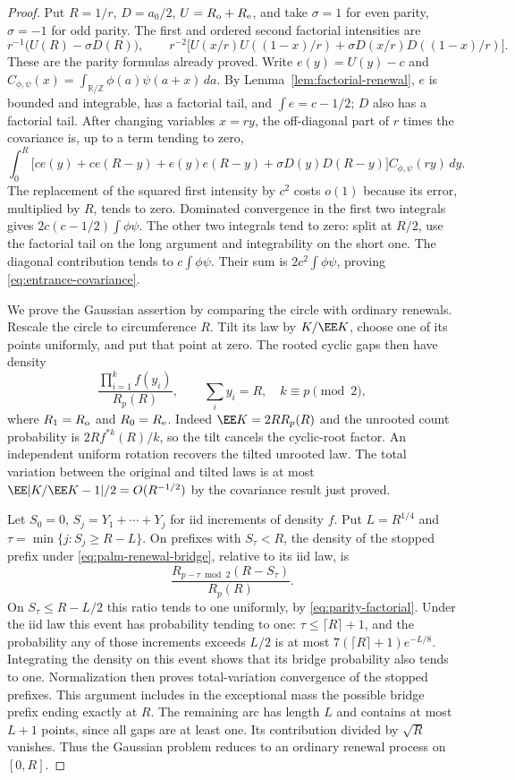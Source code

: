 \documentclass[11pt,letterpaper]{article}
\newcommand{\T}{\mathbb R/\mathbb Z}\newcommand{\Leb}{\operatorname{Leb}}
\begin{document}
\begin{proof}
Put $R=1/r$, $D=a_0/2$, $U=R_{\rm o}+R_{\rm e}$, and take
$\sigma=1$ for even parity, $\sigma=-1$ for odd parity. The first and
ordered second factorial intensities are
\[
 r^{-1}\big(U(R)-\sigma D(R)\big),\qquad
 r^{-2}\big[U(x/r)U((1-x)/r)+\sigma D(x/r)D((1-x)/r)\big].
\]
These are the parity formulas already proved. Write $e(y)=U(y)-c$ and
$C_{\phi,\psi}(x)=\int_{\T}\phi(a)\psi(a+x)\,da$.
By Lemma~\ref{lem:factorial-renewal}, $e$ is bounded and integrable,
has a factorial tail, and $\int e=c-1/2$; $D$ also has a factorial tail.
After changing variables $x=ry$, the off-diagonal part of $r$ times
the covariance is, up to a term tending to zero,
\[
 \int_0^R\big[c e(y)+c e(R-y)+e(y)e(R-y)
                      +\sigma D(y)D(R-y)\big]C_{\phi,\psi}(ry)\,dy.
\]
The replacement of the squared first intensity by $c^2$ costs $o(1)$
because its error, multiplied by $R$, tends to zero. Dominated convergence
in the first two integrals gives $2c(c-1/2)\int\phi\psi$.
The other two integrals tend to zero: split at $R/2$, use the factorial
tail on the long argument and integrability on the short one.
The diagonal contribution tends to $c\int\phi\psi$. Their sum is
$2c^2\int\phi\psi$, proving \eqref{eq:entrance-covariance}.

We prove the Gaussian assertion by comparing the circle with ordinary
renewals. Rescale the circle to circumference $R$. Tilt its law by
$K/\EE K$, choose one of its points uniformly, and put that point at zero.
The rooted cyclic gaps then have density
\begin{equation}\label{eq:palm-renewal-bridge}
 \frac{\prod_{i=1}^k f(y_i)}{R_p(R)},\qquad
 \sum_i y_i=R,\quad k\equiv p\pmod2,
\end{equation}
where $R_1=R_{\rm o}$ and $R_0=R_{\rm e}$.
Indeed $\EE K=2R R_p(R)$ and the unrooted count probability is
$2R f^{*k}(R)/k$, so the tilt cancels the cyclic-root factor.
An independent uniform rotation recovers the tilted unrooted law.
The total variation between the original and tilted laws is at most
$\EE|K/\EE K-1|/2=O(R^{-1/2})$ by the covariance result just proved.

Let $S_0=0$, $S_j=Y_1+\cdots+Y_j$ for iid increments of density $f$.
Put $L=R^{1/4}$ and $\tau=\min\{j:S_j\ge R-L\}$.
On prefixes with $S_\tau<R$, the density of the stopped prefix under
\eqref{eq:palm-renewal-bridge}, relative to its iid law, is
\[
 \frac{R_{p-\tau\bmod2}(R-S_\tau)}{R_p(R)}.
\]
On $S_\tau\le R-L/2$ this ratio tends to one uniformly, by
\eqref{eq:parity-factorial}. Under the iid law this event has probability
tending to one: $\tau\le\lceil R\rceil+1$, and the probability any of
those increments exceeds $L/2$ is at most
$7(\lceil R\rceil+1)e^{-L/8}$.
Integrating the density on this event shows that its bridge probability
also tends to one. Normalization then proves total-variation convergence
of the stopped prefixes. This argument includes in the exceptional mass
the possible bridge prefix ending exactly at $R$.
The remaining arc has length $L$ and contains at most $L+1$ points,
since all gaps are at least one. Its contribution divided by $\sqrt R$
vanishes. Thus the Gaussian problem reduces to an ordinary renewal
process on $[0,R]$.


\end{proof}
\end{document}
